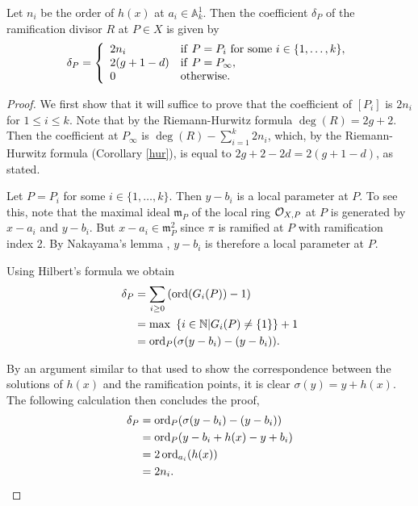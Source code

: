     \begin{lem}\label{char2ramification}
    Let $n_i$ be the order of $h(x)$ at $a_i\in \mathbb A_k^1$.
    Then the coefficient $\delta_P$ of the ramification divisor $R$ at $P\in X$ is given by
        \[
        \delta_P = \left\{
            \begin{array}{ll}
            2n_i & {\rm if }\ P=P_i\ {\rm for\ some }\ i \in \{1,\ldots ,k\}, \\
            2(g+1-d) & {\rm if }\  P=P_\infty, \\
            0 & {\rm otherwise.} 
            \end{array}
        \right.
        \]
    \end{lem}
    \begin{proof}
    We first show that it will suffice to prove that the coefficient of $[P_i]$ is $2n_i$ for $1\leq i \leq k$.
    Note that by the Riemann-Hurwitz formula $\deg(R) = 2g+2$.
    Then the coefficient at $P_\infty$ is $\deg(R) - \sum_{i=1}^k2n_i$, which, by the Riemann-Hurwitz formula (Corollary \ref{hur}), is equal to $2g+2-2d = 2(g+1-d)$, as stated.
    
    Let $P=P_i$ for some $i\in \{1,\ldots , k\}$.
    Then $y-b_i$ is a local parameter at $P$.
    To see this, note that the maximal ideal $\mathfrak m_{P}$ of the local ring ${\cal O}_{X,P}$ at $P$ is generated by $x-a_i$ and $y-b_i$.
    But $x-a_i\in \mathfrak m_{P}^2$ since $\pi$ is ramified at $P$ with ramification index 2.
    By Nakayama's lemma \cite[Prop. 2.6]{atiyahmacdonald}, $y-b_i$ is therefore a local parameter at $P$.
    
    Using Hilbert's formula \cite[Chap. IV, \S 1, Prop. 4]{localfields} we obtain
        \begin{align*}
        \delta_P & =  \sum_{i\geq 0} \left(\operatorname{ord}(G_i(P))-1\right) \\
        & =  {\rm max\ }\left\{ i\in {\mathbb N} | G_i(P)\neq \{1\}\right\} + 1 \\
        & =  \operatorname{ord}_{P}(\sigma(y-b_i) - (y-b_i)).
        \end{align*}
    
    By an argument similar to that used to show the correspondence between the solutions of $h(x)$ and the ramification points, it is clear $\sigma(y)=y+h(x)$.
    The following calculation then concludes the proof,
        \begin{align*}
        \delta_P & =  \operatorname{ord}_{P}(\sigma(y-b_i) - (y-b_i)) \\
        & =  \operatorname{ord}_{P}(y-b_i+h(x) - y + b_i) \\
        & =  2\operatorname{ord}_{a_i}(h(x)) \\
        & =  2n_i.
        \end{align*}
    \end{proof}



